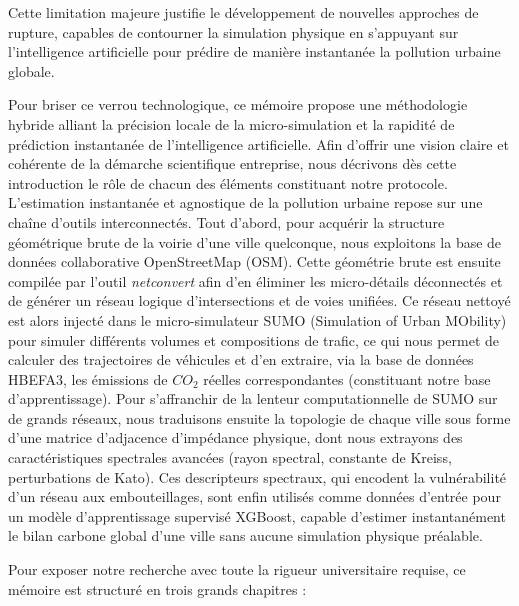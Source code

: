 \documentclass[10pt, a4paper]{article}
\begin{document}
Cette limitation majeure justifie le développement de nouvelles
approches de rupture, capables de contourner la simulation physique en
s'appuyant sur l'intelligence artificielle pour prédire de manière
instantanée la pollution urbaine globale.

Pour briser ce verrou technologique, ce mémoire propose une méthodologie
hybride alliant la précision locale de la micro-simulation et la
rapidité de prédiction instantanée de l'intelligence artificielle. Afin
d'offrir une vision claire et cohérente de la démarche scientifique
entreprise, nous décrivons dès cette introduction le rôle de chacun des
éléments constituant notre protocole. L'estimation instantanée et
agnostique de la pollution urbaine repose sur une chaîne d'outils
interconnectés. Tout d'abord, pour acquérir la structure géométrique
brute de la voirie d'une ville quelconque, nous exploitons la base de
données collaborative OpenStreetMap (OSM). Cette géométrie brute est
ensuite compilée par l'outil \emph{netconvert} afin d'en éliminer les
micro-détails déconnectés et de générer un réseau logique
d'intersections et de voies unifiées. Ce réseau nettoyé est alors
injecté dans le micro-simulateur SUMO (Simulation of Urban MObility)
pour simuler différents volumes et compositions de trafic, ce qui nous
permet de calculer des trajectoires de véhicules et d'en extraire, via
la base de données HBEFA3, les émissions de \(CO_2\) réelles
correspondantes (constituant notre base d'apprentissage). Pour
s'affranchir de la lenteur computationnelle de SUMO sur de grands
réseaux, nous traduisons ensuite la topologie de chaque ville sous forme
d'une matrice d'adjacence d'impédance physique, dont nous extrayons des
caractéristiques spectrales avancées (rayon spectral, constante de
Kreiss, perturbations de Kato). Ces descripteurs spectraux, qui encodent
la vulnérabilité d'un réseau aux embouteillages, sont enfin utilisés
comme données d'entrée pour un modèle d'apprentissage supervisé XGBoost,
capable d'estimer instantanément le bilan carbone global d'une ville
sans aucune simulation physique préalable.

Pour exposer notre recherche avec toute la rigueur universitaire
requise, ce mémoire est structuré en trois grands chapitres :
\end{document}
